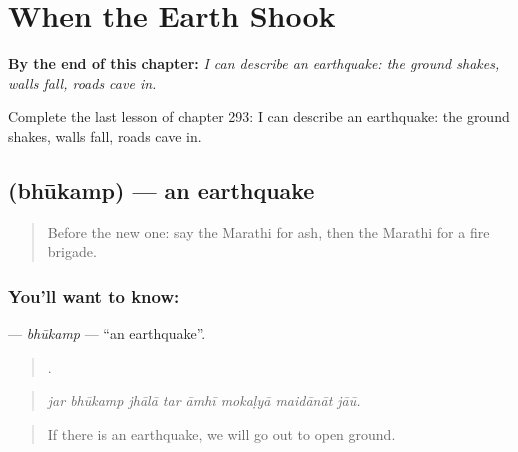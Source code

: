 
\chapter{When the Earth Shook}
\label{ch:mr-when-the-earth-shook}

\begin{chapteropening}
\textbf{By the end of this chapter:} \emph{I can describe an earthquake: the ground shakes, walls fall, roads cave in.}

Complete the last lesson of chapter 293: I can describe an earthquake: the ground shakes, walls fall, roads cave in.
\end{chapteropening}

\section[\texorpdfstring{\mr{भूकंप} (bhūkamp)}{भूकंप (bhūkamp)}]{ (bhūkamp) — an earthquake}

\label{lesson:MR-C293-bhukamp}



\begin{quote}
Before the new one: say the Marathi for ash, then the Marathi for a fire brigade.
\end{quote}

\subsection*{You'll want to know: }
\textbf{} — \emph{bhūkamp} — \textquotedblleft{}an earthquake\textquotedblright{}.

\begin{quote}
       .
\end{quote}

\begin{quote}
\emph{jar bhūkamp jhālā tar āmhī mokaḷyā maidānāt jāū.}
\end{quote}

\begin{quote}
If there is an earthquake, we will go out to open ground.
\end{quote}

